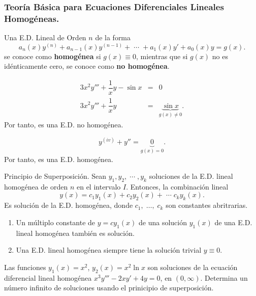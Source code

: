 \documentclass{beamer}
\begin{document}
\frame{\titlepage}

\begin{frame}[t]
	\frametitle{Teoría Básica para Ecuaciones Diferenciales Lineales Homogéneas.}
\begin{definition}
	Una E.D. Lineal de Orden \(n\) de la forma
	\[
		a_n(x) y^{(n)} +a_{n-1} (x) y^{(n-1)} + \;\cdots\; + a_1(x) y' +a_0(x) y = g(x).
	\]
	se conoce como \textbf{homogénea} si \(g(x) \equiv 0\), mientras que si \(g(x)\) no es idénticamente cero, se conoce como \textbf{no homogénea}.
\end{definition}
	\begin{example}
		\[
			\begin{array}{rcl}
				3x^2y''' + \dfrac{1}{x} y - \sin x & = & 0 \\[2mm]
				3x^2y''' + \dfrac{1}{x} y & = & \underbrace{\sin x} _{g(x) \ne 0} .
			\end{array}
		\]
		Por tanto, es una E.D. no homogénea.
	\end{example}
\end{frame}

\begin{frame}[t]
	\begin{example}
		\[
			y^{(iv)} +y'' = \underbrace{0} _{g(x) =0}.
		\]
		Por tanto, es una E.D. homogénea.
	\end{example} 
	\begin{block}{Principio de Superposición.}
		Sean \(y_1,y_2, \;\cdots\; ,y_k\) soluciones de la E.D. lineal homogénea de orden \(n\) en el intervalo \(I\). Entonces, la combinación lineal
		\[
			y(x) = c_1y_1(x) + c_2y_2(x) + \;\cdots\; c_ky_k(x).
		\]
		Es solución de la E.D. homogénea, donde \(c_1, \;\ldots,\; c_k\) son constantes abritrarias.
	\end{block}
\end{frame}

\begin{frame}[t]
	\begin{corollary}
		\begin{enumerate}
			\item Un múltiplo constante de \(y=cy_1(x)\) de una solución \(y_1(x)\) de una E.D. lineal homogénea también es solución.
			\item Una E.D. lineal homogénea siempre tiene la solución trivial \(y \equiv 0\).
		\end{enumerate}
	\end{corollary} 
	\begin{example}
		Las funciones \(y_1(x) = x^2\), \(y_2(x) =x^2 \ln x\) son soluciones de la ecuación diferencial lineal homogénea \(x^3y''' -2xy' +4y=0\), en \((0, \infty)\). Determina un número infinito de soluciones usando el prinicipio de superposición.
	\end{example}
\end{frame}
\end{document}
